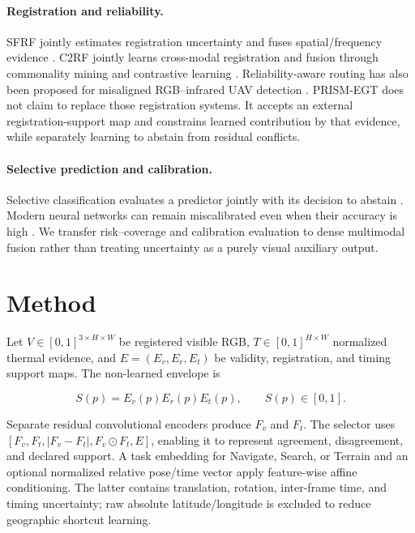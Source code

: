 \documentclass[10pt]{article}
\begin{document}
\paragraph{Registration and reliability.}
SFRF jointly estimates registration uncertainty and fuses spatial/frequency
evidence \citep{li2026sfrf}. C2RF jointly learns cross-modal registration and
fusion through commonality mining and contrastive learning
\citep{tang2025c2rf}. Reliability-aware routing has also been proposed
for misaligned RGB--infrared UAV detection \citep{hou2026leryolo}. PRISM-EGT
does not claim to replace those registration systems. It accepts an external
registration-support map and constrains learned contribution by that evidence,
while separately learning to abstain from residual conflicts.

\paragraph{Selective prediction and calibration.}
Selective classification evaluates a predictor jointly with its decision to
abstain \citep{geifman2017selective}. Modern neural networks can remain
miscalibrated even when their accuracy is high \citep{guo2017calibration}.
We transfer risk--coverage and calibration evaluation to dense multimodal
fusion rather than treating uncertainty as a purely visual auxiliary output.

\section{Method}

Let $V\in[0,1]^{3\times H\times W}$ be registered visible RGB, $T\in
[0,1]^{H\times W}$ normalized thermal evidence, and $E=(E_v,E_r,E_t)$ be
validity, registration, and timing support maps. The non-learned envelope is

\begin{equation}
  S(p)=E_v(p)E_r(p)E_t(p), \qquad S(p)\in[0,1].
\end{equation}

Separate residual convolutional encoders produce $F_v$ and $F_t$. The selector
uses $[F_v,F_t,|F_v-F_t|,F_v\odot F_t,E]$, enabling it to represent agreement,
disagreement, and declared support. A task embedding for Navigate, Search, or
Terrain and an optional normalized relative pose/time vector apply feature-wise
affine conditioning. The latter contains translation, rotation, inter-frame
time, and timing uncertainty; raw absolute latitude/longitude is excluded to
reduce geographic shortcut learning.
\end{document}
